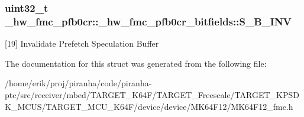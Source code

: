 \subsubsection[{\texorpdfstring{S\+\_\+\+B\+\_\+\+I\+NV}{S_B_INV}}]{\setlength{\rightskip}{0pt plus 5cm}uint32\+\_\+t \+\_\+hw\+\_\+fmc\+\_\+pfb0cr\+::\+\_\+hw\+\_\+fmc\+\_\+pfb0cr\+\_\+bitfields\+::\+S\+\_\+\+B\+\_\+\+I\+NV}\hypertarget{struct__hw__fmc__pfb0cr_1_1__hw__fmc__pfb0cr__bitfields_aa49e1d1a0f37e271368be0a40de17d0e}{}\label{struct__hw__fmc__pfb0cr_1_1__hw__fmc__pfb0cr__bitfields_aa49e1d1a0f37e271368be0a40de17d0e}
\mbox{[}19\mbox{]} Invalidate Prefetch Speculation Buffer 

The documentation for this struct was generated from the following file\+:\begin{DoxyCompactItemize}
\item 
/home/erik/proj/piranha/code/piranha-\/ptc/src/receiver/mbed/\+T\+A\+R\+G\+E\+T\+\_\+\+K64\+F/\+T\+A\+R\+G\+E\+T\+\_\+\+Freescale/\+T\+A\+R\+G\+E\+T\+\_\+\+K\+P\+S\+D\+K\+\_\+\+M\+C\+U\+S/\+T\+A\+R\+G\+E\+T\+\_\+\+M\+C\+U\+\_\+\+K64\+F/device/device/\+M\+K64\+F12/M\+K64\+F12\+\_\+fmc.\+h\end{DoxyCompactItemize}
